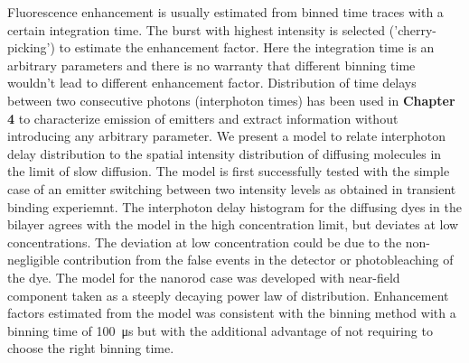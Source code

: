 Fluorescence enhancement is usually estimated from binned time traces with a certain integration time.
The burst with highest intensity is selected ('cherry-picking') to estimate the enhancement factor.
Here the integration time is an arbitrary parameters and there is no warranty that different binning time wouldn't lead to different enhancement factor.
Distribution of time delays between two consecutive photons (interphoton times) has been used in \textbf{Chapter 4} to characterize emission of emitters and extract information without introducing any arbitrary parameter.
We present a model to relate interphoton delay distribution to the spatial intensity distribution of diffusing molecules in the limit of slow diffusion.
The model is first successfully tested with the simple case of an emitter switching between two intensity levels as obtained in transient binding experiemnt.
The interphoton delay histogram for the diffusing dyes in the bilayer agrees with the model in the high concentration limit, but deviates at low concentrations.
The deviation at low concentration could be due to the non-negligible contribution from the false events in the detector or photobleaching of the dye.
The model for the nanorod case was developed with near-field component taken as a steeply decaying power law of distribution.
Enhancement factors estimated from the model was consistent with the binning method with a binning time of \SI{100}{\us} but with the additional advantage of not requiring to choose the right binning time.


